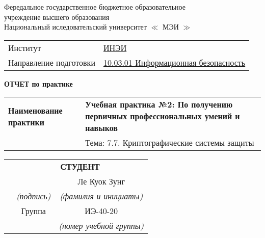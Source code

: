 \begin{titlepage}
   \begin{center}
    Фередальное государственное бюджетное образовательное \\
    учреждение высшего образования\\
    Национальный иследовательский университет $\ll$ МЭИ $\gg$
    \begin{tabularx}{\columnwidth}{
        l l
    }
        Институт & \underline{ИНЭИ} \\
        Направление подготовки & \underline{10.03.01 Информационная безопасность}
    \end{tabularx}
    \end{center}
    
    \vspace{0.5cm}
    \centering
    \textbf{ОТЧЕТ по практике}
    
    \begin{center}
    \begin{tabularx}{\textwidth}{
        p{3.3 cm} X
    }
        \textbf{Наименование практики} & \textbf{Учебная практика №2: По получению первичных профессиональных умений и навыков} \\
        & Тема: 7.7. Криптографические системы защиты
    \end{tabularx}
    \end{center}
    
    \vspace{1cm}
    
    \begin{center}
    \begin{tabularx}{\textwidth}{p{} c c}
        & \multicolumn{2}{c}{\textbf{СТУДЕНТ}} \\
        & & Ле Куок Зунг \\ \cline{2-3}
        & \small \textit{(подпись)} & \small \textit{(фамилия и инициаты)} \\
        & Группа & ИЭ-40-20 \\ \cline{2-3}
        & & \small \textit{(номер учебной группы)}
    \end{tabularx}
    \end{center}
    

\end{titlepage}
